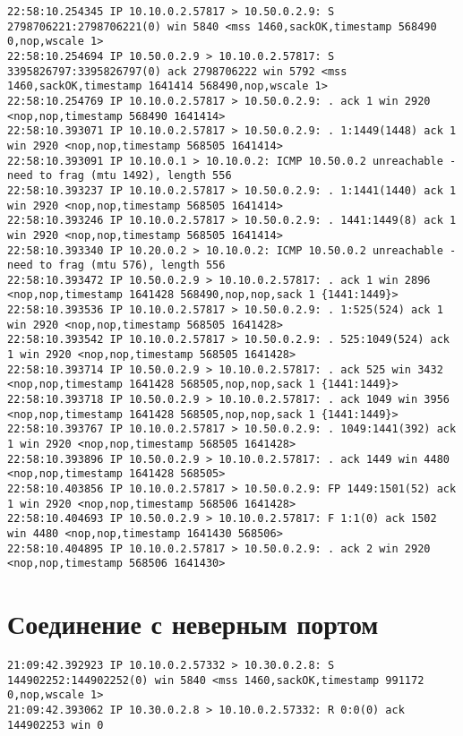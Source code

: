 \documentclass[a4paper,12pt]{article}
\begin{document}
\begin{lstlisting}
22:58:10.254345 IP 10.10.0.2.57817 > 10.50.0.2.9: S 2798706221:2798706221(0) win 5840 <mss 1460,sackOK,timestamp 568490 0,nop,wscale 1>
22:58:10.254694 IP 10.50.0.2.9 > 10.10.0.2.57817: S 3395826797:3395826797(0) ack 2798706222 win 5792 <mss 1460,sackOK,timestamp 1641414 568490,nop,wscale 1>
22:58:10.254769 IP 10.10.0.2.57817 > 10.50.0.2.9: . ack 1 win 2920 <nop,nop,timestamp 568490 1641414>
22:58:10.393071 IP 10.10.0.2.57817 > 10.50.0.2.9: . 1:1449(1448) ack 1 win 2920 <nop,nop,timestamp 568505 1641414>
22:58:10.393091 IP 10.10.0.1 > 10.10.0.2: ICMP 10.50.0.2 unreachable - need to frag (mtu 1492), length 556
22:58:10.393237 IP 10.10.0.2.57817 > 10.50.0.2.9: . 1:1441(1440) ack 1 win 2920 <nop,nop,timestamp 568505 1641414>
22:58:10.393246 IP 10.10.0.2.57817 > 10.50.0.2.9: . 1441:1449(8) ack 1 win 2920 <nop,nop,timestamp 568505 1641414>
22:58:10.393340 IP 10.20.0.2 > 10.10.0.2: ICMP 10.50.0.2 unreachable - need to frag (mtu 576), length 556
22:58:10.393472 IP 10.50.0.2.9 > 10.10.0.2.57817: . ack 1 win 2896 <nop,nop,timestamp 1641428 568490,nop,nop,sack 1 {1441:1449}>
22:58:10.393536 IP 10.10.0.2.57817 > 10.50.0.2.9: . 1:525(524) ack 1 win 2920 <nop,nop,timestamp 568505 1641428>
22:58:10.393542 IP 10.10.0.2.57817 > 10.50.0.2.9: . 525:1049(524) ack 1 win 2920 <nop,nop,timestamp 568505 1641428>
22:58:10.393714 IP 10.50.0.2.9 > 10.10.0.2.57817: . ack 525 win 3432 <nop,nop,timestamp 1641428 568505,nop,nop,sack 1 {1441:1449}>
22:58:10.393718 IP 10.50.0.2.9 > 10.10.0.2.57817: . ack 1049 win 3956 <nop,nop,timestamp 1641428 568505,nop,nop,sack 1 {1441:1449}>
22:58:10.393767 IP 10.10.0.2.57817 > 10.50.0.2.9: . 1049:1441(392) ack 1 win 2920 <nop,nop,timestamp 568505 1641428>
22:58:10.393896 IP 10.50.0.2.9 > 10.10.0.2.57817: . ack 1449 win 4480 <nop,nop,timestamp 1641428 568505>
22:58:10.403856 IP 10.10.0.2.57817 > 10.50.0.2.9: FP 1449:1501(52) ack 1 win 2920 <nop,nop,timestamp 568506 1641428>
22:58:10.404693 IP 10.50.0.2.9 > 10.10.0.2.57817: F 1:1(0) ack 1502 win 4480 <nop,nop,timestamp 1641430 568506>
22:58:10.404895 IP 10.10.0.2.57817 > 10.50.0.2.9: . ack 2 win 2920 <nop,nop,timestamp 568506 1641430>
\end{lstlisting}

\section{Соединение с неверным портом}

\begin{lstlisting}
21:09:42.392923 IP 10.10.0.2.57332 > 10.30.0.2.8: S 144902252:144902252(0) win 5840 <mss 1460,sackOK,timestamp 991172 0,nop,wscale 1>
21:09:42.393062 IP 10.30.0.2.8 > 10.10.0.2.57332: R 0:0(0) ack 144902253 win 0
\end{lstlisting}
\end{document}
